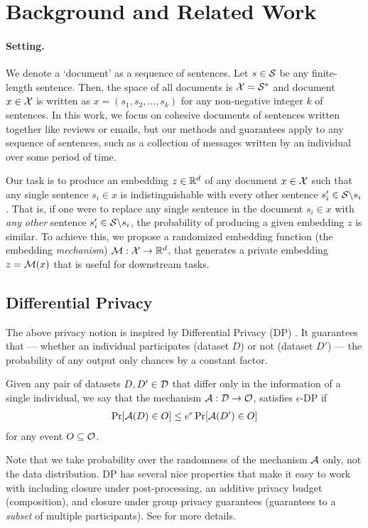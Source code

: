 \section{Background and Related Work}

\paragraph{Setting.}We denote a `document' as a sequence of sentences. Let $s \in \mathcal{S}$ be any finite-length sentence. Then, the space of all documents is $\mathcal{X} = \mathcal{S}^*$ and document $x \in \mathcal{X}$ is written as $x = (s_1, s_2, \dots, s_k)$ for any non-negative integer $k$ of sentences. In this work, we focus on cohesive documents of sentences written together like reviews or emails, but our methods and guarantees apply to any sequence of sentences, such as a collection of messages written by an individual over some period of time.

Our task is to produce an embedding $z \in {\mathbb R}^d$ of any document $x \in \mathcal{X}$ such that any single sentence $s_i \in x$ is indistinguishable with every other sentence $s_i' \in \mathcal{S} \backslash s_i$. That is, if one were to replace any single sentence in the document $s_i \in x$ with \emph{any other} sentence $s_i' \in \mathcal{S} \backslash s_i$, the probability of producing a given embedding $z$ is similar. To achieve this, we propose a randomized embedding function (the embedding \emph{mechanism}) $\mathcal{M} : \mathcal{X} \rightarrow {\mathbb R}^d$, that generates a private embedding $z = \mathcal{M}(x)$ that is useful for downstream tasks. 

\subsection{Differential Privacy}
The above privacy notion is inspired by Differential Privacy (DP) \cite{DP}. It guarantees that --- whether an individual participates (dataset $D$) or not (dataset $D'$) --- the probability of any output only chances by a constant factor. 

\begin{definition}
	Given any pair of datasets $D, D' \in \mathcal{D}$ that differ only in the information of a single individual, we say that the mechanism $\mathcal{A} : \mathcal{D} \rightarrow \mathcal{O}$, satisfies $\epsilon$-DP if 
	\begin{align*}
		\Pr[\mathcal{A}(D) \in O] \leq e^\epsilon \Pr[\mathcal{A}(D') \in O]
	\end{align*}
	for any event $O \subseteq \mathcal{O}$. 
\end{definition}
Note that we take probability over the randomness of the mechanism $\mathcal{A}$ only, not the data distribution. DP has several nice properties that make it easy to work with including closure under post-processing, an additive privacy budget (composition), and closure under group privacy guarantees (guarantees to a \emph{subset} of multiple participants). See \citealt{DPbook} for more details. 

